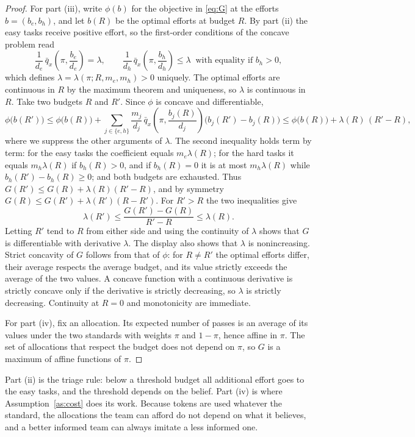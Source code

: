 \documentclass[11pt]{article}
\theoremstyle{definition}
\begin{document}
\begin{proof}
For part (iii), write $\phi(b)$ for the objective in \eqref{eq:G} at the efforts $b=(b_e,b_h)$, and let $b(R)$ be the optimal efforts at budget $R$. By part (ii) the easy tasks receive positive effort, so the first-order conditions of the concave problem read
\[
\frac{1}{d_e}\,\bar q_x\!\left(\pi,\frac{b_e}{d_e}\right)=\lambda,
\qquad
\frac{1}{d_h}\,\bar q_x\!\left(\pi,\frac{b_h}{d_h}\right)\le\lambda\ \text{ with equality if } b_h>0,
\]
which defines $\lambda=\lambda(\pi;R,m_e,m_h)>0$ uniquely. The optimal efforts are continuous in $R$ by the maximum theorem and uniqueness, so $\lambda$ is continuous in $R$. Take two budgets $R$ and $R'$. Since $\phi$ is concave and differentiable,
\[
\phi\bigl(b(R')\bigr)\le\phi\bigl(b(R)\bigr)+\sum_{j\in\{e,h\}}\frac{m_j}{d_j}\,\bar q_x\!\left(\pi,\frac{b_j(R)}{d_j}\right)\bigl(b_j(R')-b_j(R)\bigr)
\le\phi\bigl(b(R)\bigr)+\lambda(R)\,(R'-R),
\]
where we suppress the other arguments of $\lambda$. The second inequality holds term by term: for the easy tasks the coefficient equals $m_e\lambda(R)$; for the hard tasks it equals $m_h\lambda(R)$ if $b_h(R)>0$, and if $b_h(R)=0$ it is at most $m_h\lambda(R)$ while $b_h(R')-b_h(R)\ge0$; and both budgets are exhausted. Thus $G(R')\le G(R)+\lambda(R)(R'-R)$, and by symmetry $G(R)\le G(R')+\lambda(R')(R-R')$. For $R'>R$ the two inequalities give
\[
\lambda(R')\le\frac{G(R')-G(R)}{R'-R}\le\lambda(R).
\]
Letting $R'$ tend to $R$ from either side and using the continuity of $\lambda$ shows that $G$ is differentiable with derivative $\lambda$. The display also shows that $\lambda$ is nonincreasing. Strict concavity of $G$ follows from that of $\phi$: for $R\ne R'$ the optimal efforts differ, their average respects the average budget, and its value strictly exceeds the average of the two values. A concave function with a continuous derivative is strictly concave only if the derivative is strictly decreasing, so $\lambda$ is strictly decreasing. Continuity at $R=0$ and monotonicity are immediate.

For part (iv), fix an allocation. Its expected number of passes is an average of its values under the two standards with weights $\pi$ and $1-\pi$, hence affine in $\pi$. The set of allocations that respect the budget does not depend on $\pi$, so $G$ is a maximum of affine functions of $\pi$.
\end{proof}

Part (ii) is the triage rule: below a threshold budget all additional effort goes to the easy tasks, and the threshold depends on the belief. Part (iv) is where Assumption~\ref{as:cost} does its work. Because tokens are used whatever the standard, the allocations the team can afford do not depend on what it believes, and a better informed team can always imitate a less informed one.
\end{document}
